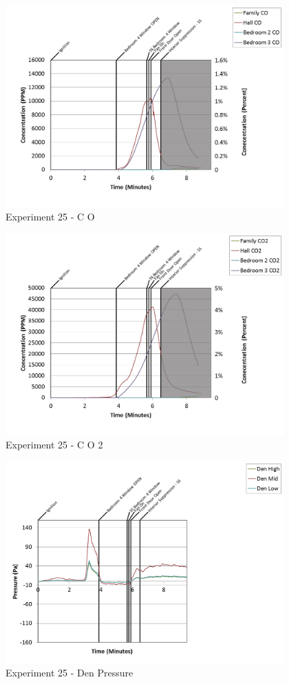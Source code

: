 \documentclass{article}
\begin{document}
\begin{appendices}
\clearpage

\begin{figure}[h!]
	\centering
	\includegraphics[height=3.05in]{0_Images/Results_Charts/Exp_25_Charts/CO.png}
	\caption{Experiment 25 - C O}
\end{figure}


\begin{figure}[h!]
	\centering
	\includegraphics[height=3.05in]{0_Images/Results_Charts/Exp_25_Charts/CO2.png}
	\caption{Experiment 25 - C O 2}
\end{figure}

\clearpage

\begin{figure}[h!]
	\centering
	\includegraphics[height=3.05in]{0_Images/Results_Charts/Exp_25_Charts/DenPressure.png}
	\caption{Experiment 25 - Den Pressure}
\end{figure}



\end{appendices}
\end{document}
